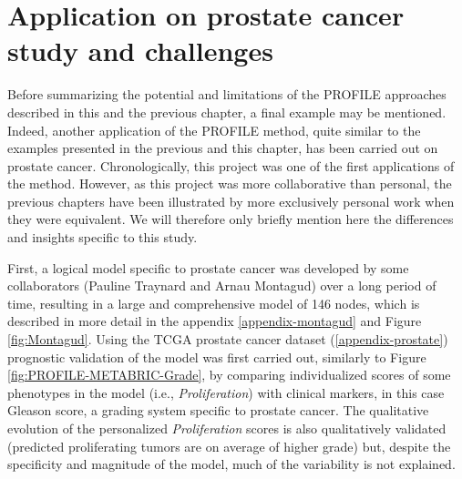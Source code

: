 \documentclass[a4paper,12pt,twoside,onecolumn,openright,final,oldfontcommands]{memoir}
\begin{document}
\section{Application on prostate cancer study and
challenges}\label{prostate-model}

Before summarizing the potential and limitations of the PROFILE
approaches described in this and the previous chapter, a final example
may be mentioned. Indeed, another application of the PROFILE method,
quite similar to the examples presented in the previous and this
chapter, has been carried out on prostate cancer. Chronologically, this
project was one of the first applications of the method. However, as
this project was more collaborative than personal, the previous chapters
have been illustrated by more exclusively personal work when they were
equivalent. We will therefore only briefly mention here the differences
and insights specific to this study.

First, a logical model specific to prostate cancer was developed by some
collaborators (Pauline Traynard and Arnau Montagud) over a long period
of time, resulting in a large and comprehensive model of 146 nodes,
which is described in more detail in the appendix
\ref{appendix-montagud} and Figure \ref{fig:Montagud}. Using the TCGA
prostate cancer dataset (\ref{appendix-prostate}) prognostic validation
of the model was first carried out, similarly to Figure
\ref{fig:PROFILE-METABRIC-Grade}, by comparing individualized scores of
some phenotypes in the model (i.e., \emph{Proliferation}) with clinical
markers, in this case Gleason score, a grading system specific to
prostate cancer. The qualitative evolution of the personalized
\emph{Proliferation} scores is also qualitatively validated (predicted
proliferating tumors are on average of higher grade) but, despite the
specificity and magnitude of the model, much of the variability is not
explained.
\end{document}
